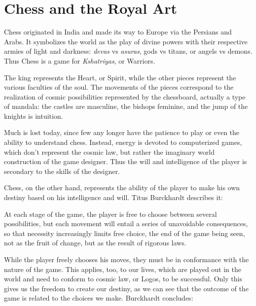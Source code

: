 \section{Chess and the Royal Art}

Chess originated in India and made its way to Europe via the Persians and Arabs. It symbolizes the world as the play of divine powers with their respective armies of light and darkness: \emph{devas} vs
\emph{asuras}, gods vs titans, or angels vs demons. Thus Chess is a game for \emph{Kshatriyas}, or Warriors.

The king represents the Heart, or Spirit, while the other pieces represent the various faculties of the soul. The movements of the pieces correspond to the realization of cosmic possibilities represented by the chessboard, actually a type of mandala: the castles are masculine, the bishops feminine, and the jump of the knights is intuition.

Much is lost today, since few any longer have the patience to play or even the ability to understand chess. Instead, energy is devoted to computerized games, which don't represent the cosmic law, but rather the imaginary world construction of the game designer. Thus the will and intelligence of the player is secondary to the skills of the designer.

Chess, on the other hand, represents the ability of the player to make his own destiny based on his intelligence and will. Titus Burckhardt describes it:

\begin{quotex}
At each stage of the game, the player is free to choose between several possibilities, but each movement will entail a series of unavoidable consequences, so that necessity increasingly limits free choice, the end of the game being seen, not as the fruit of change, but as the result of rigorous laws.
\end{quotex}


While the player freely chooses his moves, they must be in conformance with the nature of the game. This applies, too, to our lives, which are played out in the world and need to conform to cosmic law, or Logos, to be successful. Only this gives us the freedom to create our destiny, as we can see that the outcome of the game is related to the choices we make. Burckhardt concludes:

